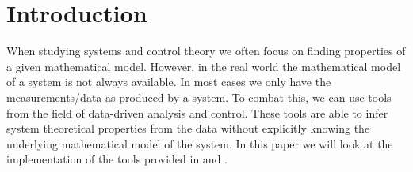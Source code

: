 \section{Introduction}
When studying systems and control theory we often focus on finding properties of a given mathematical model. However, in the real world the mathematical model of a system is not always available. In most cases we only have the measurements/data as produced by a system. To combat this, we can use tools from the field of data-driven analysis and control. These tools are able to infer system theoretical properties from the data without explicitly knowing the underlying mathematical model of the system. In this paper we will look at the implementation of the tools provided in \cite{waarde2019data} and \cite{waarde2020noisy}.